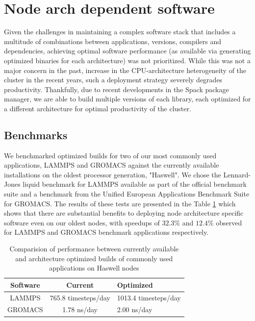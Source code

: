 \documentclass[manuscript,screen]{acmart}
\begin{document}
\section{Node arch dependent software}

Given the challenges in maintaining a complex software stack that includes a multitude of combinations between applications, versions, compilers and dependencies, achieving optimal software performance (as available via generating optimized binaries for each architecture) was not prioritized. While this was not a major concern in the past, increase in the CPU-architecture heterogeneity of the cluster in the recent years, such a deployment strategy severely degrades productivity. Thankfully, due to recent developments in the Spack package manager, we are able to build multiple versions of each library, each optimized for a different architecture for optimal productivity of the cluster. 

\subsection{Benchmarks}
We benchmarked optimized builds for two of our most commonly used applications, LAMMPS\cite{lammps} and GROMACS \cite{gromacs_1995,gromacs_2015} against the currently available installations on the oldest processor generation, "Haswell". We chose the Lennard-Jones liquid benchmark for LAMMPS available as part of the official benchmark suite \cite{lammps_bench} and a benchmark from the Unified European Applications Benchmark Suite \cite{ueabs_prace,ueabs_repo} for GROMACS. The results of these tests are presented in the Table \ref{tab:bench_apps} which shows that there are substantial benefits to deploying node architecture specific software even on our oldest nodes, with speedups of $32.3\%$ and $12.4\%$ observed for LAMMPS and GROMACS benchmark applications respectively.

\begin{table}
	\caption{Comparision of performance between currently available and architecture optimized builds of commonly used applications on Haswell nodes}
	\label{tab:bench_apps}
	\begin{tabular}{ccl}
		\toprule
		Software &Current&Optimized\\
		\midrule
		LAMMPS & 765.8 timesteps/day&1013.4 timesteps/day\\
		GROMACS & 1.78 ns/day&2.00 ns/day\\
		\bottomrule
	\end{tabular}
\end{table}
\end{document}
